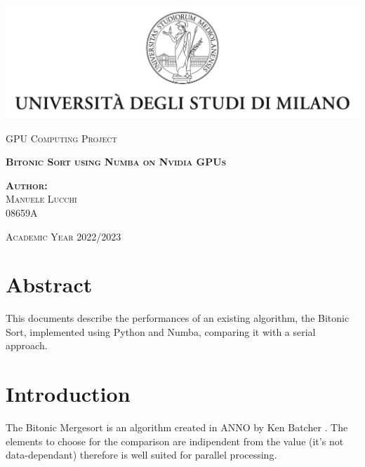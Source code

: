 \documentclass[a4paper, 12pt, oneside]{article}
\begin{document}
\begin{titlepage} %

  \begin{center}
    \includegraphics{images/logo.jpg}\par
    \vspace{1cm}
    {\scshape\large GPU Computing Project\par}
    \vspace{4cm}
    {\scshape\large\bfseries Bitonic Sort using Numba on Nvidia GPUs\par}
    \vspace{4cm}
  \end{center}

  \begin{center}
    \scshape\normalsize\textbf{Author:}\\Manuele Lucchi\\08659A \par
  \end{center}

  \vfill

  {\begin{center}
      \scshape\large Academic Year 2022/2023
    \end{center}}

\end{titlepage}

\section{Abstract}
This documents describe the performances of an existing algorithm, the Bitonic Sort, implemented using Python and Numba, comparing it with a serial approach.

\tableofcontents


\section{Introduction}
The Bitonic Mergesort \cite{bitonic} is an algorithm created in ANNO by Ken Batcher \cite{ken}. The elements to choose for the comparison are indipendent from the value (it's not data-dependant) therefore is well suited for parallel processing.\\
\end{document}
